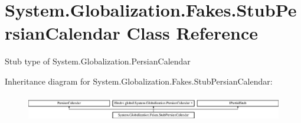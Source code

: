 \hypertarget{class_system_1_1_globalization_1_1_fakes_1_1_stub_persian_calendar}{\section{System.\-Globalization.\-Fakes.\-Stub\-Persian\-Calendar Class Reference}
\label{class_system_1_1_globalization_1_1_fakes_1_1_stub_persian_calendar}
}


Stub type of System.\-Globalization.\-Persian\-Calendar 


Inheritance diagram for System.\-Globalization.\-Fakes.\-Stub\-Persian\-Calendar\-:\begin{figure}[H]
\begin{center}
\leavevmode
\includegraphics[height=1.148718cm]{class_system_1_1_globalization_1_1_fakes_1_1_stub_persian_calendar}
\end{center}
\end{figure}
